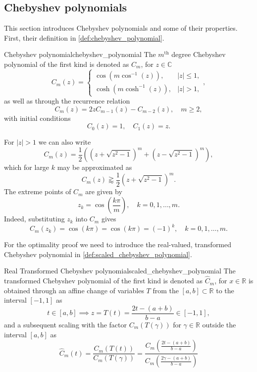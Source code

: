 \subsection{Chebyshev polynomials}
This section introduces Chebyshev polynomials and some of their properties. First, their definition in \cref{def:chebyshev_polynomial}.
\begin{APPfancydef}{Chebyshev polynomial}{chebyshev_polynomial}
  The $m^{\text{th}}$ degree Chebyshev polynomial of the first kind is denoted as $C_m$, for $z\in\mathbb{C}$
  \[
    C_m(z) = \begin{cases}
      \cos(m \cos^{-1}(z)), & |z| \leq 1, \\
      \cosh(m \cosh^{-1}(z)), & |z| > 1,
    \end{cases},
  \]
  as well as through the recurrence relation
  \[
    C_m(z) = 2z C_{m-1}(z) - C_{m-2}(z), \quad m \geq 2,
  \]
  with initial conditions
  \[
    C_0(z) = 1, \quad C_1(z) = z.
  \]
\end{APPfancydef}

For $|z|>1$ we can also write
\begin{equation}
  C_m(z) = \frac{1}{2}\left(\left(z + \sqrt{z^2 - 1}\right)^m + \left(z - \sqrt{z^2 - 1}\right)^m\right),
  \label{eq:chebyshev_polynomial_explicit}
\end{equation}
which for large $k$ may be approximated as
\begin{equation}
  C_m(z) \gtrapprox \frac{1}{2}\left(z + \sqrt{z^2 - 1}\right)^m.
  \label{eq:chebyshev_polynomial_approximation}
\end{equation}
The extreme points of $C_m$ are given by
\begin{equation}
  z_k = \cos\left(\frac{k \pi}{m}\right), \quad k = 0, 1, \dots, m.
  \label{eq:chebyshev_polynomial_extreme_points}
\end{equation}
Indeed, substituting $z_k$ into $C_m$ gives 
\begin{equation}
  C_m(z_k) = \cos(k \pi) = \cos(k \pi) = (-1)^k, \quad k = 0, 1, \dots, m.
  \label{eq:chebyshev_polynomial_extrema}
\end{equation}
 
For the optimality proof we need to introduce the real-valued, transformed Chebyshev polynomial in \cref{def:scaled_chebyshev_polynomial}.
\begin{APPfancydef}{Real Transformed Chebyshev polynomial}{scaled_chebyshev_polynomial}
  The transformed Chebyshev polynomial of the first kind is denoted as $\hat{C}_m$, for $x\in\mathbb{R}$ is obtained through an affine change of variables $T$ from the $[a, b] \subset \mathbb{R}$ to the interval $[-1, 1]$ as
  \[
    t \in [a,b] \implies z = T(t) = \frac{2t - (a + b)}{b - a} \in [-1, 1],
  \]
  and a subsequent scaling with the factor $C_m(T(\gamma))$ for $\gamma\in\mathbb{R}$ outside the interval $[a, b]$ as
  \[
    \hat{C}_m(t) = \frac{C_m(T(t))}{C_m(T(\gamma))} = \frac{C_m\left(\frac{2t - (a + b)}{b - a}\right)}{C_m\left(\frac{2\gamma - (a + b)}{b - a}\right)}
  \]
\end{APPfancydef}

